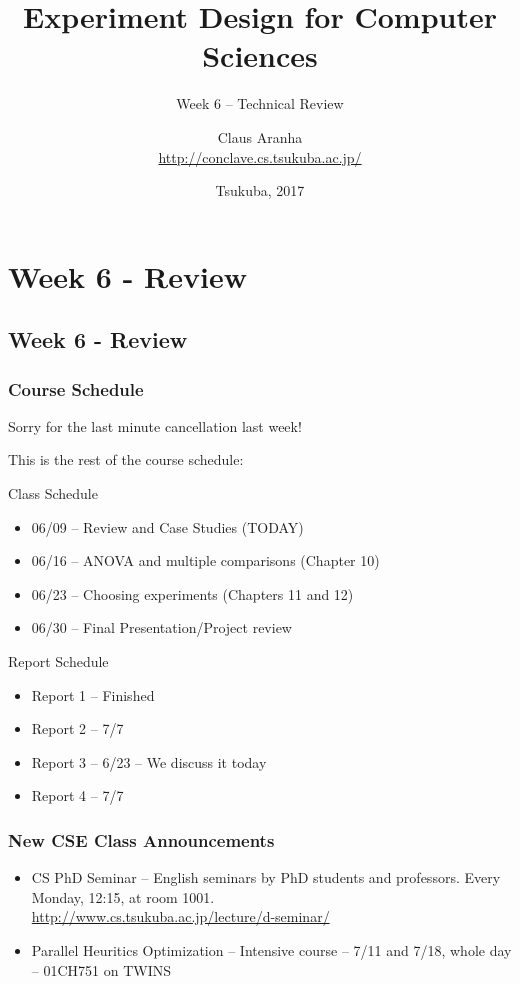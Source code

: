\documentclass[t]{beamer}
\title[]{Experiment Design for Computer Sciences}
\subtitle[]{Week 6 -- Technical Review}
\author[]{Claus Aranha\\{\footnotesize \url{http://conclave.cs.tsukuba.ac.jp/}}}
\institute{Computer Science Department}
\date{\scriptsize Tsukuba, 2017}
\begin{document}
\section{Week 6 - Review}
\subsection{Week 6 - Review}

\begin{frame}
  \titlepage
\end{frame}

\begin{frame}
  \frametitle{Course Schedule}
  Sorry for the last minute cancellation last week!

  This is the rest of the course schedule:

  \begin{block}{Class Schedule}
  \begin{itemize}
  \item 06/09 -- Review and Case Studies (TODAY)  
  \item 06/16 -- ANOVA and multiple comparisons (Chapter 10)
  \item 06/23 -- Choosing experiments (Chapters 11 and 12)
  \item 06/30 -- Final Presentation/Project review
  \end{itemize}
  \end{block}

  \begin{block}{Report Schedule}
    \begin{itemize}
    \item Report 1 -- Finished
    \item Report 2 -- 7/7
    \item Report 3 -- 6/23 -- We discuss it today
    \item Report 4 -- 7/7 
    \end{itemize}
  \end{block}
\end{frame}

\begin{frame}
  \frametitle{New CSE Class Announcements}
  \begin{itemize}
  \item CS PhD Seminar -- English seminars by PhD students and
    professors. Every Monday, 12:15, at room 1001.\\
    \url{http://www.cs.tsukuba.ac.jp/lecture/d-seminar/}
  \item Parallel Heuritics Optimization -- Intensive course -- 7/11
    and 7/18, whole day -- 01CH751 on TWINS
  \end{itemize}
\end{frame}
\end{document}
